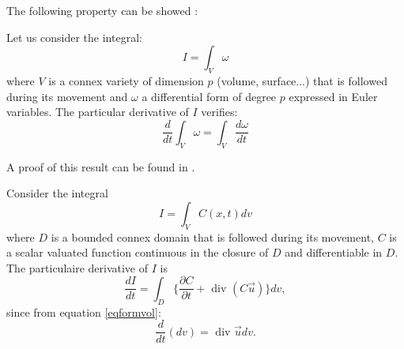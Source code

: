 \documentclass[12pt]{book}
\begin{document}
The following property can be showed \cite{ph:fluid:Germain80}:
\begin{prop}
Let us consider the integral:
\begin{equation}
I=\int_V\omega
\end{equation}
where $V$ is a connex variety of dimension $p$ (volume,
surface...) that is followed during its movement and $\omega$ a differential
form of degree $p$ expressed in Euler variables. The particular derivative of
$I$ verifies:
\begin{equation}
\frac{d}{dt}\int_V \omega = \int_V \frac{d \omega}{dt}
\end{equation}
\end{prop}
A proof of this result can be found in \cite{ph:fluid:Germain80}.
\begin{exmp}
Consider the integral
\begin{equation}
I=\int_V C(x,t) dv
\end{equation}
where $D$ is a bounded connex domain that is followed during its movement, $C$
is a scalar valuated function continuous in the closure of $D$ and
differentiable in $D$. The particulaire derivative of $I$ is
\begin{equation}
\frac {dI}{dt}=\int_D\{\frac{\partial
C}{\partial t}+\mbox{ div }(C\vec{u})\}dv,
\end{equation}
since from equation \ref{eqformvol}:
\begin{equation}
\frac{d}{dt}(dv)=\mbox{ div }\vec{u} dv.
\end{equation}
\end{exmp}
\end{document}

